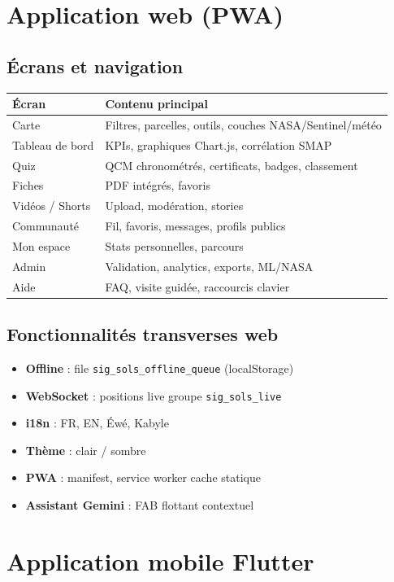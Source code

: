 \documentclass[11pt,a4paper]{report}
\begin{document}
\chapter{Application web (PWA)}

\section{Écrans et navigation}
\begin{tabularx}{\textwidth}{@{}lX@{}}
\toprule
\textbf{Écran} & \textbf{Contenu principal} \\
\midrule
Carte & Filtres, parcelles, outils, couches NASA/Sentinel/météo \\
Tableau de bord & KPIs, graphiques Chart.js, corrélation SMAP \\
Quiz & QCM chronométrés, certificats, badges, classement \\
Fiches & PDF intégrés, favoris \\
Vidéos / Shorts & Upload, modération, stories \\
Communauté & Fil, favoris, messages, profils publics \\
Mon espace & Stats personnelles, parcours \\
Admin & Validation, analytics, exports, ML/NASA \\
Aide & FAQ, visite guidée, raccourcis clavier \\
\bottomrule
\end{tabularx}

\section{Fonctionnalités transverses web}
\begin{itemize}[leftmargin=*]
  \item \textbf{Offline} : file \texttt{sig\_sols\_offline\_queue} (localStorage)
  \item \textbf{WebSocket} : positions live groupe \texttt{sig\_sols\_live}
  \item \textbf{i18n} : FR, EN, Éwé, Kabyle
  \item \textbf{Thème} : clair / sombre
  \item \textbf{PWA} : manifest, service worker cache statique
  \item \textbf{Assistant Gemini} : FAB flottant contextuel
\end{itemize}

\chapter{Application mobile Flutter}
\end{document}
